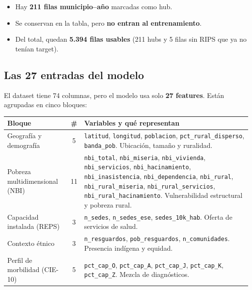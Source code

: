 \documentclass[11pt,a4paper]{article}
\newcommand{\code}[1]{\texttt{#1}}
\begin{document}
\begin{itemize}[leftmargin=*]
  \item Hay \textbf{211 filas municipio--año} marcadas como hub.
  \item Se conservan en la tabla, pero \textbf{no entran al entrenamiento}.
  \item Del total, quedan \textbf{5.394 filas usables} (211 hubs y 5 filas sin RIPS que ya no tenían target).
\end{itemize}

\subsection{Las 27 entradas del modelo}

El dataset tiene 74 columnas, pero el modelo usa solo \textbf{27 features}. Están agrupadas en cinco bloques:

\begin{table}[H]
\centering
\small
\begin{tabularx}{\textwidth}{@{}l c Y@{}}
\toprule
\textbf{Bloque} & \textbf{\#} & \textbf{Variables y qué representan} \\
\midrule
Geografía y demografía & 5 &
\code{latitud}, \code{longitud}, \code{poblacion}, \code{pct_rural_disperso}, \code{banda_pob}.
Ubicación, tamaño y ruralidad. \\
Pobreza multidimensional (NBI) & 11 &
\code{nbi_total}, \code{nbi_miseria}, \code{nbi_vivienda}, \code{nbi_servicios},
\code{nbi_hacinamiento}, \code{nbi_inasistencia}, \code{nbi_dependencia},
\code{nbi_rural}, \code{nbi_rural_miseria}, \code{nbi_rural_servicios},
\code{nbi_rural_hacinamiento}. Vulnerabilidad estructural y pobreza rural. \\
Capacidad instalada (REPS) & 3 &
\code{n_sedes}, \code{n_sedes_ese}, \code{sedes_10k_hab}.
Oferta de servicios de salud. \\
Contexto étnico & 3 &
\code{n_resguardos}, \code{pob_resguardos}, \code{n_comunidades}.
Presencia indígena y equidad. \\
Perfil de morbilidad (CIE-10) & 5 &
\code{pct_cap_O}, \code{pct_cap_A}, \code{pct_cap_J}, \code{pct_cap_K}, \code{pct_cap_Z}.
Mezcla de diagnósticos. \\
\bottomrule
\end{tabularx}
\end{table}
\end{document}

